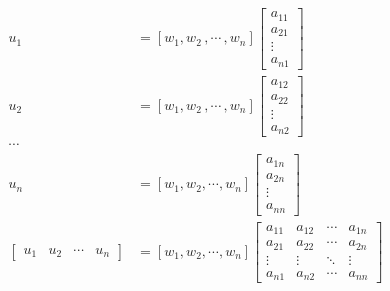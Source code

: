 \documentclass[10pt]{article}
\begin{document}
    \begin{equation}
    \begin{aligned} 
        u_1 &=  
        \left[w_{1}, w_{2} \,, \cdots \,, w_{n} \right]  
        \left[ \begin{array}{cc} 
        a_{11} \\
        a_{21} \\
        \vdots \\
        a_{n1}
        \end{array} 
        \right] \\
        u_2 &=  
        \left[w_{1}, w_{2} \,, \cdots \,, w_{n} \right]  
        \left[ \begin{array}{cc} 
        a_{12} \\
        a_{22} \\
        \vdots \\
        a_{n2}
        \end{array} 
        \right] \\
        \cdots  \\
        u_n &=   
        \left[w_{1}, w_{2} ,\cdots , w_{n} \right]  
        \left[ \begin{array}{cc} 
        a_{1n} \\
        a_{2n} \\
        \vdots \\
        a_{nn}
        \end{array} 
        \right] \\
        \begin{bmatrix}
        u_1 & u_2 & \cdots & u_n  
        \end{bmatrix} &=
        \left[w_1, w_2, \cdots, w_n \right]
        \begin{bmatrix}
        a_{11} & a_{12} & \cdots & a_{1n} \\
        a_{21} & a_{22} & \cdots & a_{2n} \\
        \vdots  & \vdots  & \ddots & \vdots  \\
        a_{n1} & a_{n2} & \cdots & a_{nn} 
        \end{bmatrix}  \nonumber \\
\end{aligned}
\end{equation}
\end{document}

